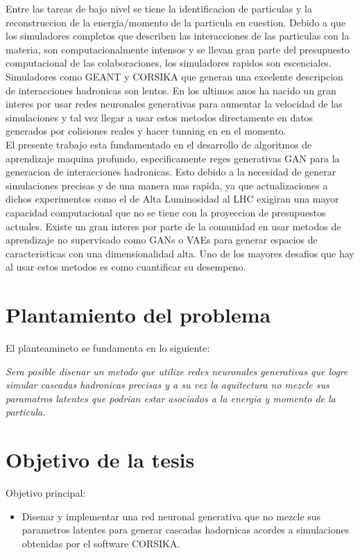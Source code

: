 Entre las tareas de bajo nivel se tiene la identificacion de particulas y la reconstruccion de la energia/momento de la particula en cuestion.
Debido a que los simuladores completos que describen las interacciones de las particulas con la materia, son computacionalmente intensos
y se llevan gran parte del presupuesto computacional de las colaboraciones, los simuladores rapidos son escenciales.
Simuladores como GEANT y CORSIKA que generan una excelente descripcion de interacciones hadronicas son lentos.
En los ultimos anos ha nacido un gran interes por usar redes neuronales generativas para aumentar la velocidad de las simulaciones y tal vez
llegar a usar estos metodos directamente en datos generados por colisiones reales y hacer tunning en en el momento.\\

El presente trabajo esta fundamentado en el desarrollo de algoritmos de aprendizaje maquina profundo, especificamente reges generativas GAN 
para la generacion de interacciones hadronicas. Esto debido a la necesidad de generar simulaciones precisas y de una manera mas rapida,
ya que actualizaciones a dichos experimentos como el de Alta Luminosidad al LHC exigiran una mayor capacidad computacional que no se tiene con la proyeccion de presupuestos actuales.
Existe un gran interes por parte de la comunidad en usar metodos de aprendizaje no supervisado como GANs o VAEs para generar espacios de caracteristicas con una dimensionalidad alta.
Uno de los mayores desafios que hay al usar estos metodos es como cuantificar su desempeno.\\

\section{Plantamiento del problema}

El planteamineto se fundamenta en lo siguiente:

\emph{Sera posible disenar un metodo que utilize redes neuronales generativas que logre simular cascadas hadronicas precisas y a su vez la aquitectura no mezcle sus paramatros latentes que podrian estar asociados a la energia y momento de la particula.} 


\section{Objetivo de la tesis}
Objetivo principal:
\begin{itemize}
    \item Disenar y implementar una red neuronal generativa que no mezcle sus parametros latentes para generar cascadas hadornicas acordes a simulaciones obtenidas por el software CORSIKA. 
\end{itemize}

